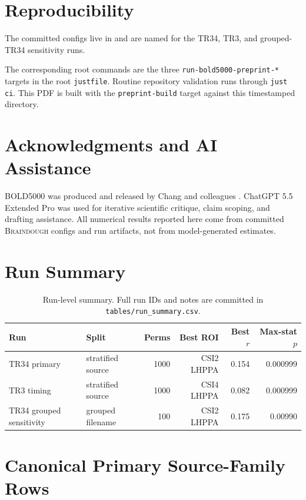 \documentclass[11pt]{article}
\newcommand{\braindough}{\textsc{Braindough}}
\newcommand{\boldfive}{BOLD5000}
\begin{document}
\section{Reproducibility}

The committed configs live in  and are named for the
TR34, TR3, and grouped-TR34 sensitivity runs.

The corresponding root commands are the three \texttt{run-bold5000-preprint-*}
targets in the root \texttt{justfile}. Routine repository validation runs
through \texttt{just ci}. This PDF is built with the \texttt{preprint-build}
target against this timestamped directory.

\section{Acknowledgments and AI Assistance}

\boldfive{} was produced and released by Chang and colleagues
\cite{chang2019bold5000}. ChatGPT 5.5 Extended Pro was used for iterative
scientific critique, claim scoping, and drafting assistance. All numerical
results reported here come from committed \braindough{} configs and run
artifacts, not from model-generated estimates.

\appendix

\section{Run Summary}

\begin{table}[ht]
  \centering
  \caption{Run-level summary. Full run IDs and notes are committed in \texttt{tables/run\_summary.csv}.}
  \label{tab:run-summary}
  \begin{tabular}{llrrrr}
    \toprule
    Run & Split & Perms & Best ROI & Best $r$ & Max-stat $p$ \\
    \midrule
    TR34 primary & stratified source & 1000 & CSI2 LHPPA & 0.154 & 0.000999 \\
    TR3 timing & stratified source & 1000 & CSI4 LHPPA & 0.082 & 0.000999 \\
    TR34 grouped sensitivity & grouped filename & 100 & CSI2 LHPPA & 0.175 & 0.00990 \\
    \bottomrule
  \end{tabular}
\end{table}

\section{Canonical Primary Source-Family Rows}
\end{document}
